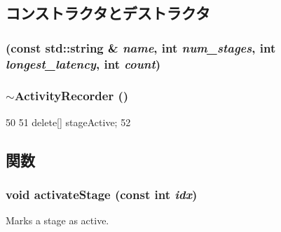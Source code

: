 \subsection{コンストラクタとデストラクタ}
\hypertarget{classActivityRecorder_aee994d49a31bd533aa152dfeb18c7b2d}{
\subsubsection[{ActivityRecorder}]{ (const std::string \& {\em name}, \/  int {\em num\_\-stages}, \/  int {\em longest\_\-latency}, \/  int {\em count})}}
\label{classActivityRecorder_aee994d49a31bd533aa152dfeb18c7b2d}
\hypertarget{classActivityRecorder_a72527148fb233d9e5a0d887becb03458}{
\subsubsection[{$\sim$ActivityRecorder}]{\setlength{\rightskip}{0pt plus 5cm}$\sim${\bf ActivityRecorder} ()}}
\label{classActivityRecorder_a72527148fb233d9e5a0d887becb03458}



\begin{DoxyCode}
50 {
51     delete[] stageActive;
52 }
\end{DoxyCode}


\subsection{関数}
\hypertarget{classActivityRecorder_a9039dad8d295c41b50eba0342e6c11c0}{
\subsubsection[{activateStage}]{\setlength{\rightskip}{0pt plus 5cm}void activateStage (const int {\em idx})}}
\label{classActivityRecorder_a9039dad8d295c41b50eba0342e6c11c0}
Marks a stage as active. 



